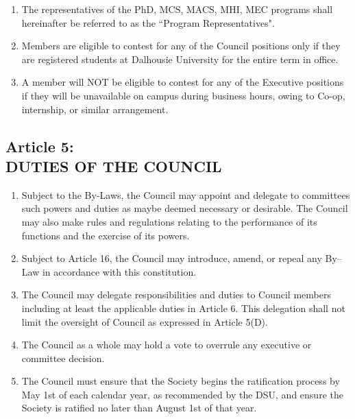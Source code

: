 \documentclass[]{report}
\begin{document}
\begin{enumerate}
\begin{enumerate}[i.]
		\end{enumerate}
		
		\item The representatives of the PhD, MCS, MACS, MHI, MEC programs shall hereinafter be referred to as the ``Program Representatives".
		
		\item Members are eligible to contest for any of the Council positions only if they are registered students at Dalhousie University for the entire term in office.
		
		\item A member will NOT be eligible to contest for any of the Executive positions if they will be unavailable on campus during business hours, owing to Co-op, internship, or similar arrangement.
			
	\end{enumerate}


\clearpage
\begin{center}
	\section*{Article 5:\\DUTIES OF THE COUNCIL}
	\vspace{12px}
\end{center}
\label{duties}
	\renewcommand{\theenumi}{\Alph{enumi}}
	\begin{enumerate}
	
		\item Subject to the By-Laws, the Council may appoint and delegate to committees such powers and duties as maybe deemed necessary or desirable. The Council may also make rules and regulations relating to the performance of its functions and the exercise of its powers.
		
		\item Subject to Article 16, the Council may introduce, amend, or repeal any By–Law in accordance with this constitution.
		
		\item The Council may delegate responsibilities and duties to Council members including at least the applicable duties in Article 6. This delegation shall not limit the oversight of Council as expressed in Article 5(D).
		
		\item The Council as a whole may hold a vote to overrule any executive or committee decision.
		
		\item The Council must ensure that the Society begins the ratification process by May 1st of each calendar year, as recommended by the DSU, and ensure the Society is ratified no later than August 1st of that year.
	
	\end{enumerate}
\end{document}
